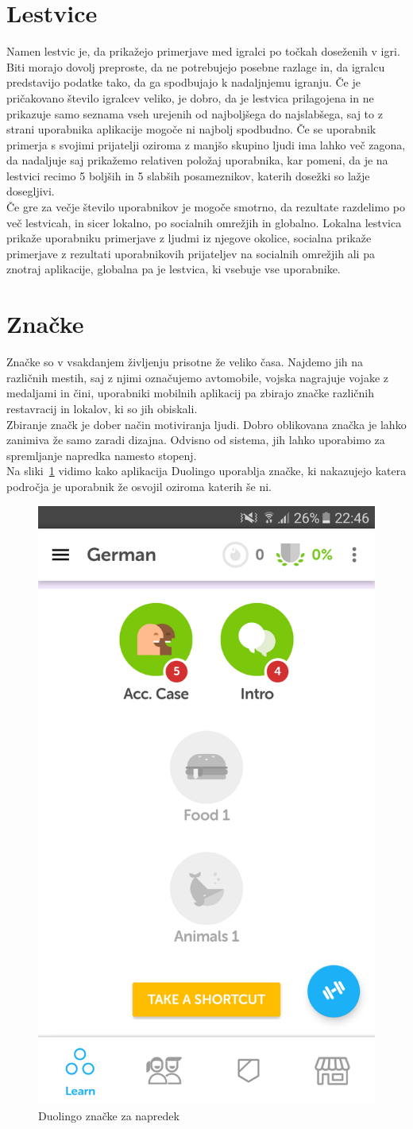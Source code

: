 \documentclass[a4paper, 12pt]{book}
\begin{document}
\section{Lestvice}
Namen lestvic je, da prikažejo primerjave med igralci po točkah doseženih v igri. Biti morajo dovolj preproste, da ne potrebujejo posebne razlage in, da igralcu predstavijo podatke tako, da ga spodbujajo k nadaljnjemu igranju. Če je pričakovano število igralcev veliko, je dobro, da je lestvica prilagojena in ne prikazuje samo seznama vseh urejenih od najboljšega do najslabšega, saj to z strani uporabnika aplikacije mogoče ni najbolj spodbudno. Če se uporabnik primerja s svojimi prijatelji oziroma z manjšo skupino ljudi ima lahko več zagona, da nadaljuje saj prikažemo relativen položaj uporabnika, kar pomeni, da je na lestvici recimo 5 boljših in 5 slabših posameznikov, katerih dosežki so lažje dosegljivi.\\ Če gre za večje število uporabnikov je mogoče smotrno, da rezultate razdelimo po več lestvicah, in sicer lokalno, po socialnih omrežjih in globalno. Lokalna lestvica prikaže uporabniku primerjave z ljudmi iz njegove okolice, socialna prikaže primerjave z rezultati uporabnikovih prijateljev na socialnih omrežjih ali pa znotraj aplikacije, globalna pa je lestvica, ki vsebuje vse uporabnike.

\section{Značke}
Značke so v vsakdanjem življenju prisotne že veliko časa. Najdemo jih na različnih mestih, saj z njimi označujemo avtomobile, vojska nagrajuje vojake z medaljami in čini, uporabniki mobilnih aplikacij pa zbirajo značke različnih restavracij in lokalov, ki so jih obiskali.\\
Zbiranje značk je dober način motiviranja ljudi. Dobro oblikovana značka je lahko zanimiva že samo zaradi dizajna. Odvisno od sistema, jih lahko uporabimo za spremljanje napredka namesto stopenj.\\
Na sliki~\ref{duolingo} vidimo kako aplikacija Duolingo uporablja značke, ki nakazujejo katera področja je uporabnik že osvojil oziroma katerih še ni.
\begin{figure}[H]
\centering
\includegraphics[height=0.7\textwidth]{slike/duolingo}
\caption{Duolingo značke za napredek}\label{duolingo}
\end{figure}
\end{document}

